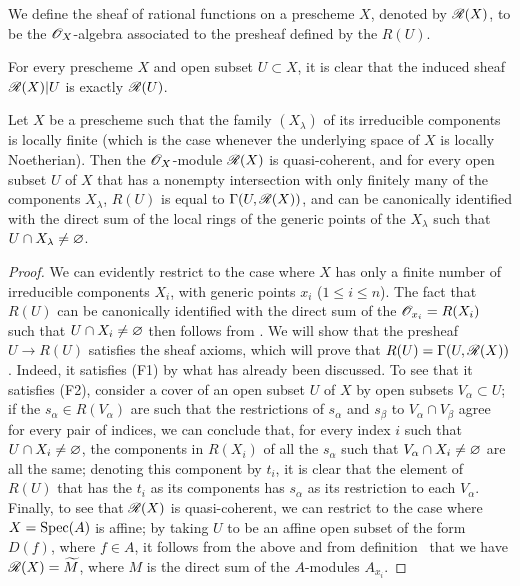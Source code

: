 \begin{defn}[7.3.2]
\label{1.7.3.2}
We
define the sheaf of rational functions on a prescheme $X$, denoted by $\mathscr{R}(X)$, to be the $\mathscr{O}_X$-algebra associated to the presheaf defined by the $R(U)$.
\end{defn}

For every prescheme $X$ and open subset $U\subset X$, it is clear that the induced sheaf $\mathscr{R}(X)|U$ is exactly $\mathscr{R}(U)$.

\begin{prop}[7.3.3]
\label{1.7.3.3}
Let $X$ be a prescheme such that the family $(X_\lambda)$ of its irreducible components is locally finite (which is the case whenever the underlying space of $X$ is locally Noetherian).
Then the $\mathscr{O}_X$-module $\mathscr{R}(X)$ is quasi-coherent, and for every open subset $U$ of $X$ that has a nonempty intersection with only finitely many of the components $X_\lambda$, $R(U)$ is equal to $\Gamma(U,\mathscr{R}(X))$, and can be canonically identified with the direct sum of the local rings of the generic points of the $X_\lambda$ such that $U\cap X_\lambda\neq\varnothing$.
\end{prop}

\begin{proof}
\label{proof-1.7.3.3}
We can evidently restrict to the case where $X$ has only a finite number of irreducible components $X_i$, with generic points $x_i$ ($1\leqslant i\leqslant n$).
The fact that $R(U)$ can be canonically identified with the direct sum of the $\mathscr{O}_{x_i}=R(X_i)$ such that $U\cap X_i\neq\varnothing$ then follows from .
We will show that the presheaf $U\to R(U)$ satisfies the sheaf axioms, which will prove that $R(U)=\Gamma(U,\mathscr{R}(X))$.
Indeed, it satisfies (F1) by what has already been discussed.
To see that it satisfies (F2), consider a cover of an open subset $U$ of $X$ by open subsets $V_\alpha\subset U$; if the $s_\alpha\in R(V_\alpha)$ are such that the restrictions of $s_\alpha$ and $s_\beta$ to $V_\alpha\cap V_\beta$ agree for every pair of indices, we can conclude that, for every index $i$ such that $U\cap X_i\neq\varnothing$, the components in $R(X_i)$ of all the $s_\alpha$ such that $V_\alpha\cap X_i\neq\varnothing$ are all the same; denoting this component by $t_i$, it is clear that the element of $R(U)$ that has the $t_i$ as its components has $s_\alpha$ as its restriction to each $V_\alpha$.
Finally, to see that $\mathscr{R}(X)$ is quasi-coherent, we can restrict to the case where $X={\mathop{\mathrm{Spec}}\nolimits}(A)$ is affine; by taking $U$ to be an affine open subset of the form $D(f)$, where $f\in A$, it follows from the above and from definition~ that we have $\mathscr{R}(X)=\widetilde{M}$, where $M$ is the direct sum of the $A$-modules $A_{x_i}$.
\end{proof}

